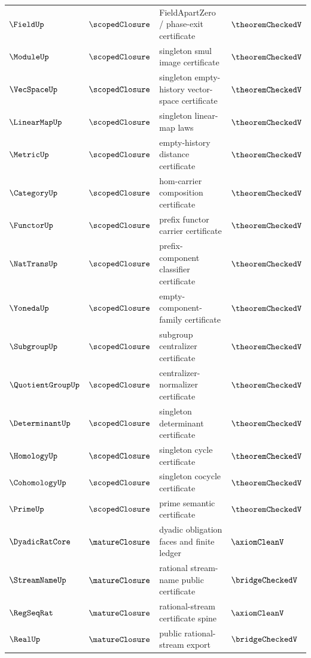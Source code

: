 \begin{longtable}{p{}p{}p{}p{}}
$\FieldUp$       & $\scopedClosure$ & FieldApartZero / phase-exit certificate                  & $\theoremCheckedV$\\
$\ModuleUp$      & $\scopedClosure$ & singleton smul image certificate                         & $\theoremCheckedV$\\
$\VecSpaceUp$    & $\scopedClosure$ & singleton empty-history vector-space certificate         & $\theoremCheckedV$\\
$\LinearMapUp$   & $\scopedClosure$ & singleton linear-map laws                                & $\theoremCheckedV$\\
$\MetricUp$      & $\scopedClosure$ & empty-history distance certificate                       & $\theoremCheckedV$\\
$\CategoryUp$    & $\scopedClosure$ & hom-carrier composition certificate                      & $\theoremCheckedV$\\
$\FunctorUp$     & $\scopedClosure$ & prefix functor carrier certificate                       & $\theoremCheckedV$\\
$\NatTransUp$    & $\scopedClosure$ & prefix-component classifier certificate                  & $\theoremCheckedV$\\
$\YonedaUp$      & $\scopedClosure$ & empty-component-family certificate                       & $\theoremCheckedV$\\
$\SubgroupUp$    & $\scopedClosure$ & subgroup centralizer certificate                         & $\theoremCheckedV$\\
$\QuotientGroupUp$ & $\scopedClosure$ & centralizer-normalizer certificate                       & $\theoremCheckedV$\\
$\DeterminantUp$ & $\scopedClosure$ & singleton determinant certificate                        & $\theoremCheckedV$\\
$\HomologyUp$    & $\scopedClosure$ & singleton cycle certificate                              & $\theoremCheckedV$\\
$\CohomologyUp$  & $\scopedClosure$ & singleton cocycle certificate                            & $\theoremCheckedV$\\
$\PrimeUp$       & $\scopedClosure$ & prime semantic certificate                               & $\theoremCheckedV$\\
$\DyadicRatCore$ & $\matureClosure$ & dyadic obligation faces and finite ledger                & $\axiomCleanV$\\
$\StreamNameUp$  & $\matureClosure$ & rational stream-name public certificate                  & $\bridgeCheckedV$\\
$\RegSeqRat$     & $\matureClosure$ & rational-stream certificate spine                        & $\axiomCleanV$\\
$\RealUp$        & $\matureClosure$ & public rational-stream export                            & $\bridgeCheckedV$\\
\bottomrule
\end{longtable}

